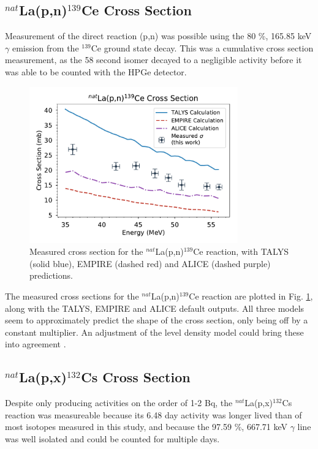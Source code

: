 \documentclass[aps,superscriptaddress,twocolumn,secnumarabic,balancelastpage,amsmath,amssymb,nofootinbib,floatfix]{revtex4-1}
\begin{document}
\subsection{$^{nat}$La(p,n)$^{139}$Ce Cross Section}

Measurement of the direct reaction (p,n) was possible using the 80 \%, 165.85 keV $\gamma$ emission from the $^{139}$Ce ground state decay.  This was a cumulative cross section measurement, as the 58 second isomer decayed to a negligible activity before it was able to be counted with the HPGe detector.

\begin{figure}[htb]
\includegraphics[width=9cm]{cross_sections/139CE}
\caption{Measured cross section for the $^{nat}$La(p,n)$^{139}$Ce reaction, with TALYS (solid blue), EMPIRE (dashed red) and ALICE (dashed purple) predictions.
}
\label{fig:139CE}
\end{figure}

The measured cross sections for the $^{nat}$La(p,n)$^{139}$Ce reaction are plotted in Fig. \ref{fig:139CE}, along with the TALYS, EMPIRE and ALICE default outputs.  All three models seem to approximately predict the shape of the cross section, only being off by a constant multiplier.  An adjustment of the level density model could bring these into agreement \cite{BRINK1957215}.

\subsection{$^{nat}$La(p,x)$^{132}$Cs Cross Section}

Despite only producing activities on the order of 1-2 Bq, the $^{nat}$La(p,x)$^{132}$Cs reaction was measureable because its 6.48 day activity was longer lived than of most isotopes measured in this study, and because the 97.59 \%, 667.71 keV $\gamma$ line was well isolated and could be counted for multiple days.
\end{document}
